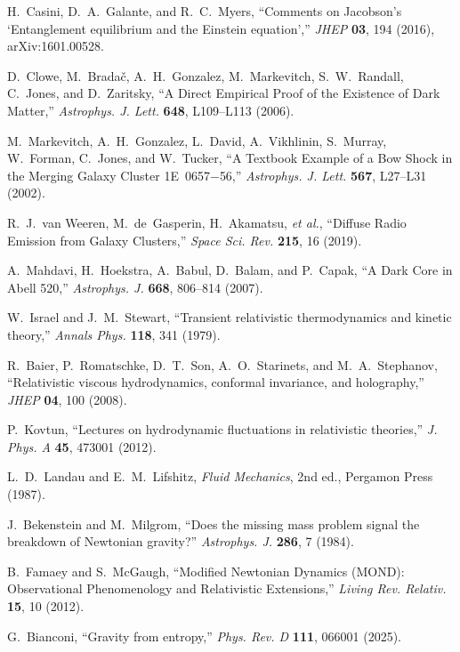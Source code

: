 \documentclass[aps,prd,onecolumn,superscriptaddress,nofootinbib]{revtex4-2}
\begin{document}
\begin{thebibliography}{99}
H.~Casini, D.~A.~Galante, and R.~C.~Myers,
``Comments on Jacobson's `Entanglement equilibrium and the Einstein equation',''
\emph{JHEP} \textbf{03}, 194 (2016), arXiv:1601.00528.

D.~Clowe, M.~Brada\v{c}, A.~H.~Gonzalez, M.~Markevitch, S.~W.~Randall, C.~Jones, and D.~Zaritsky,
``A Direct Empirical Proof of the Existence of Dark Matter,''
\emph{Astrophys. J. Lett.} \textbf{648}, L109–L113 (2006).

M.~Markevitch, A.~H.~Gonzalez, L.~David, A.~Vikhlinin, S.~Murray, W.~Forman, C.~Jones, and W.~Tucker,
``A Textbook Example of a Bow Shock in the Merging Galaxy Cluster 1E~0657$-$56,''
\emph{Astrophys. J. Lett.} \textbf{567}, L27–L31 (2002).

R.~J.~van Weeren, M.~de~Gasperin, H.~Akamatsu, \emph{et al.},
``Diffuse Radio Emission from Galaxy Clusters,''
\emph{Space Sci. Rev.} \textbf{215}, 16 (2019).

A.~Mahdavi, H.~Hoekstra, A.~Babul, D.~Balam, and P.~Capak,
``A Dark Core in Abell 520,''
\emph{Astrophys. J.} \textbf{668}, 806–814 (2007).

W.~Israel and J.~M.~Stewart,
``Transient relativistic thermodynamics and kinetic theory,''
\emph{Annals Phys.} \textbf{118}, 341 (1979).

R.~Baier, P.~Romatschke, D.~T.~Son, A.~O.~Starinets, and M.~A.~Stephanov,
``Relativistic viscous hydrodynamics, conformal invariance, and holography,''
\emph{JHEP} \textbf{04}, 100 (2008).

P.~Kovtun,
``Lectures on hydrodynamic fluctuations in relativistic theories,''
\emph{J. Phys. A} \textbf{45}, 473001 (2012).

L.~D.~Landau and E.~M.~Lifshitz,
\emph{Fluid Mechanics}, 2nd ed., Pergamon Press (1987).

J.~Bekenstein and M.~Milgrom,
``Does the missing mass problem signal the breakdown of Newtonian gravity?''
\emph{Astrophys. J.} \textbf{286}, 7 (1984).

B.~Famaey and S.~McGaugh,
``Modified Newtonian Dynamics (MOND): Observational Phenomenology and Relativistic Extensions,''
\emph{Living Rev. Relativ.} \textbf{15}, 10 (2012).

G.~Bianconi,
``Gravity from entropy,''
\emph{Phys. Rev. D} \textbf{111}, 066001 (2025).
\end{thebibliography}
\end{document}
